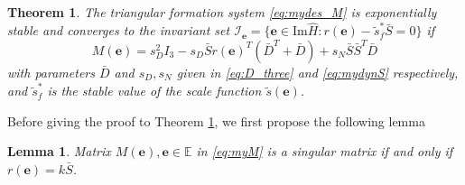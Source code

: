 \documentclass[times]{rncauth}
\newtheorem{thm}{Theorem}[section]
\newtheorem{lem}{Lemma}[section]
\begin{document}
\begin{thm}\label{thm:stable}
The triangular formation system \eqref{eq:mydes_M} is exponentially
stable and converges to the invariant set
$\mathcal{I}_\mathbf{e}=\{\mathbf{e}\in\text{Im}\hat{H}:r(\mathbf{e})-\tilde{s}^*_f\bar{S}=0\}$
if
\begin{equation}\label{eq:myM}
  M(\mathbf{e})=s_D^2 I_3-s_D \bar{S} r(\mathbf{e})^T(\bar{D}^T+\bar{D}) +
  s_N
  \bar{S} \bar{S}^T \bar{D}
\end{equation} with parameters $\bar{D}$ and $s_D,s_N$
given in \eqref{eq:D_three} and \eqref{eq:mydynS} respectively, and
$\tilde{s}^*_f$ is the stable value of the scale function
$\tilde{s}(\mathbf{e})$.
\end{thm}
Before giving the proof to Theorem \ref{thm:stable}, we first
propose the following lemma
\begin{lem}\label{lemma:M_nonsigular}
  Matrix $M(\mathbf{e}),\mathbf{e}\in\mathbb{E}$ in \eqref{eq:myM} is a singular matrix
  if and only if $r(\mathbf{e})= k\bar{S}$.
\end{lem}
\end{document}
